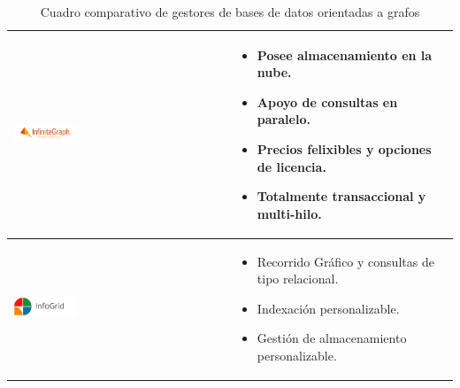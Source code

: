 \begin{table}[b!]
\begin{tabular}{|p{2cm}|ll}
        \hline
          \multicolumn{1}{|p{5cm}|}{\includegraphics[width=0.3\textwidth]{images/InfiniteGraph}} & 
          \multicolumn{1}{p{10cm}|}{
          \begin{itemize}
          \vspace{-7mm}
        \item Posee almacenamiento en la nube.
        \item Apoyo de consultas en paralelo.
        \item Precios felixibles y opciones de licencia.
        \item Totalmente transaccional y multi-hilo.
      \end{itemize}} \\ 
        \hline
          \multicolumn{1}{|p{3cm}|}{\includegraphics[width=0.3\textwidth]{images/InfoGrid}} & 
          \multicolumn{1}{p{10cm}|}{
          \begin{itemize}
          \vspace{-10mm}
        \item Recorrido Gráfico y consultas de tipo relacional.
        \item Indexación personalizable.
        \item Gestión de almacenamiento personalizable.
      \end{itemize}}\\ 
         \hline
      \end{tabular}
      \caption{Cuadro comparativo de gestores de bases de datos orientadas a grafos}
      \label{table:bd orientadas a grafos}
    \end{table}
\newpage
